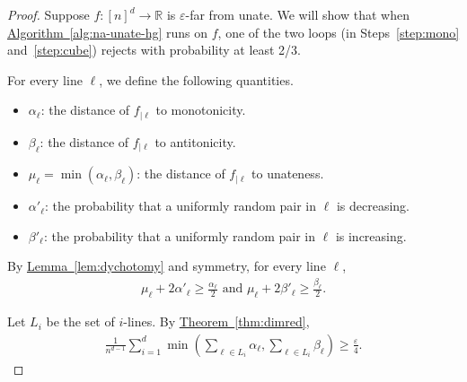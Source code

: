 \documentclass[11pt]{article}
\numberwithin{equation}{section}
\theoremstyle{definition}
\theoremstyle{plain}
\newcommand{\R}{\mathbb R}
\newcommand{\expref}[2]{\hyperref[#2]{#1~\ref{#2}}}
\newcommand{\eps}{\varepsilon}
\newcommand{\Alg}[1]{\expref{Algorithm}{alg:#1}}
\newcommand{\Thm}[1]{\expref{Theorem}{thm:#1}}
\newcommand{\Lem}[1]{\expref{Lemma}{lem:#1}}
\begin{document}
\begin{proof} Suppose $f:[n]^d \to \R$ is $\eps$-far from unate.
We will show that when \Alg{na-unate-hg} runs on $f$, one of the two loops
%
%
(in Steps~\ref{step:mono} and~\ref{step:cube})   %
rejects with probability at least 2/3.

For every line $\ell$, we define the following quantities.
\begin{itemize}
\item $\alpha_\ell$: the distance of $f_{|\ell}$ to monotonicity.
\item $\beta_\ell$: the distance of $f_{|\ell}$ to
%
%
antitonicity. %
\item $\mu_\ell=\min(\alpha_\ell,\beta_\ell)$: the distance of $f_{|\ell}$ to unateness.
%
\item $\alpha'_\ell$: the probability that a uniformly random pair in $\ell$ is decreasing.
\item $\beta'_\ell$: the probability that a uniformly random pair in $\ell$ is increasing.
%
\end{itemize}

%
%
By \Lem{dychotomy} and symmetry, for every line $\ell$,
%
\begin{align}
	\mu_\ell + 2\alpha'_\ell \geq \frac{\alpha_\ell}2 \text{ and } \mu_\ell + 2\beta'_\ell \geq \frac{\beta_\ell}2. \label{eqn:dychotomy}
\end{align}

Let $L_i$ be the set of $i$-lines. By
\Thm{dimred},
\begin{align}
\frac{1}{n^{d-1}} \sum_{i=1}^d \min\left(\sum_{\ell \in L_i} \alpha_\ell, \sum_{\ell \in L_i} \beta_\ell \right) \geq \frac{\eps}{4}. \label{eqn:dim-reduction}
\end{align}

%
%


\end{proof}
\end{document}
